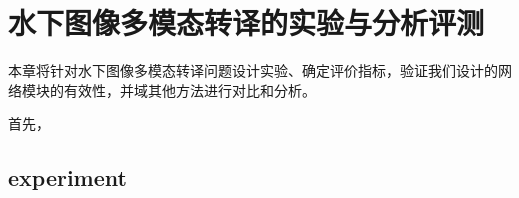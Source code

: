 \chapter{水下图像多模态转译的实验与分析评测}
本章将针对水下图像多模态转译问题设计实验、确定评价指标，验证我们设计的网络模块的有效性，并域其他方法进行对比和分析。

首先，
\section{experiment}